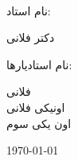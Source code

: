 \begin{titlepage}
\begin{center}
\HRule \\[1.5cm]

\vfill

\begin{minipage}{0.4\textwidth}
\begin{flushright} \Large
    نام استاد:
\end{flushright}
\begin{center} \large
    دکتر فلانی
\end{center}
\end{minipage}

\vspace*{2\baselineskip} 

\begin{minipage}{0.4\textwidth}
\begin{flushright} \Large
    نام استادیار‌ها:
\end{flushright}
\begin{center} \large
فلانی\\
اونیکی فلانی\\
اون یکی سوم
\end{center}
\end{minipage}

\vspace*{12\baselineskip} 

\today

\end{center}

\end{titlepage}
